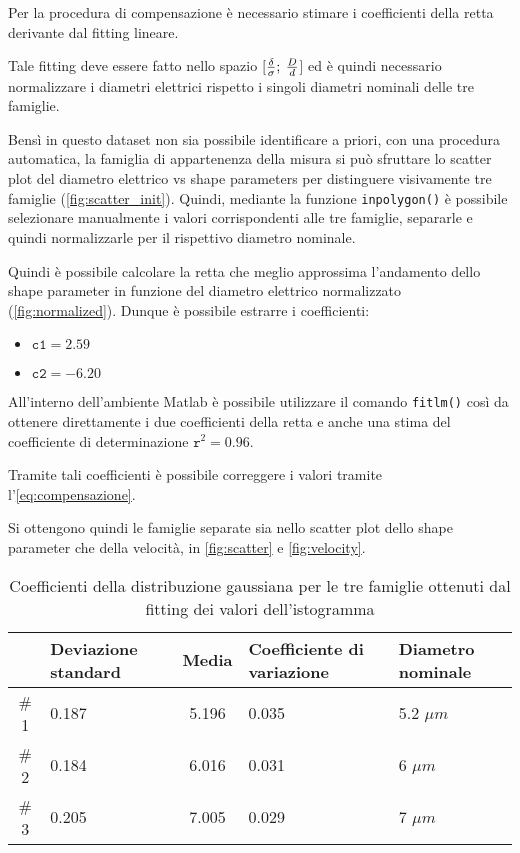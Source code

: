 Per la procedura di compensazione è necessario stimare i coefficienti della retta derivante dal fitting lineare. 

Tale fitting deve essere fatto nello spazio $[{\delta\over \sigma};\:{D\over d}$] ed è quindi necessario normalizzare i diametri elettrici rispetto i singoli diametri nominali delle tre famiglie. 

Bensì in questo dataset non sia possibile identificare a priori, con una procedura automatica, la famiglia di appartenenza della misura si può sfruttare lo scatter plot del diametro elettrico vs shape parameters per distinguere visivamente tre famiglie (\cref{fig:scatter_init}). Quindi, mediante la funzione \texttt{inpolygon()} è possibile selezionare manualmente i valori corrispondenti alle tre famiglie, separarle e quindi normalizzarle per il rispettivo diametro nominale. 

Quindi è possibile calcolare la retta che meglio approssima l'andamento dello shape parameter in funzione del diametro elettrico normalizzato (\cref{fig:normalized}). Dunque è possibile estrarre i coefficienti:
\begin{itemize}
	\item $\mathtt{c1}=2.59$
	\item $\mathtt{c2}=-6.20$
\end{itemize}

All'interno dell'ambiente Matlab è possibile utilizzare il comando \texttt{fitlm()} così da ottenere direttamente i due coefficienti della retta e anche una stima del coefficiente di determinazione $\mathtt{r}^2=0.96$. 

Tramite tali coefficienti è possibile correggere i valori tramite l'\cref{eq:compensazione}.

Si ottengono quindi le famiglie separate sia nello scatter plot dello shape parameter che della velocità, in \cref{fig:scatter} e \cref{fig:velocity}.

\begin{table}[b!]
	\centering
	\begin{tabular}{|c|p{ 1.5 cm}|c|p{1.9 cm}|p{ 1.4 cm}|}
		\hline
		& \footnotesize{Deviazione standard} & \footnotesize{Media} & \footnotesize{Coefficiente di variazione} & \footnotesize{Diametro nominale} \\
		\hline
		\# 1 & 0.187 & 5.196 & 0.035 & 5.2 $\mu m$ \\
		\hline
		\# 2 & 0.184 & 6.016 & 0.031 & 6 $\mu m$\\
		\hline
		\# 3 & 0.205 & 7.005 & 0.029 & 7 $\mu m$\\
		\hline
	\end{tabular}
	\caption{Coefficienti della distribuzione gaussiana per le tre famiglie ottenuti dal fitting dei valori dell'istogramma}
	\label{tab:fithist}
\end{table}

